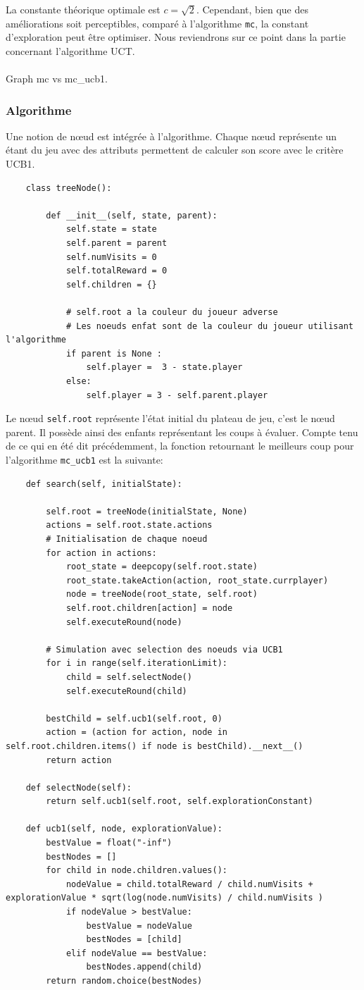 \documentclass[a4paper]{article}
\theoremstyle{definition}
\begin{document}
La constante théorique optimale est $c=\sqrt{2}$. Cependant, bien que des améliorations soit perceptibles, comparé à l'algorithme \texttt{mc}, la constant d'exploration peut être optimiser. Nous reviendrons sur ce point dans la partie concernant l'algorithme UCT. \\ \\
 
Graph mc vs mc\_ucb1.

\subsubsection{Algorithme}

Une notion de nœud est intégrée à l'algorithme. Chaque nœud représente un étant du jeu avec des attributs permettent de calculer son score avec le critère UCB1.
\newpage
\begin{lstlisting}
	class treeNode():
	
		def __init__(self, state, parent):
			self.state = state
			self.parent = parent
			self.numVisits = 0
			self.totalReward = 0
			self.children = {}
			
			# self.root a la couleur du joueur adverse 
			# Les noeuds enfat sont de la couleur du joueur utilisant l'algorithme
			if parent is None : 
				self.player =  3 - state.player
			else:
				self.player = 3 - self.parent.player
\end{lstlisting}

Le nœud \texttt{self.root} représente l'état initial du plateau de jeu, c'est le nœud parent. Il possède ainsi des enfants représentant les coups à évaluer. Compte tenu de ce qui en été dit précédemment, la fonction retournant le meilleurs coup pour l'algorithme \texttt{mc\_ucb1} est la suivante:

\begin{lstlisting}
	def search(self, initialState):
	
		self.root = treeNode(initialState, None)
		actions = self.root.state.actions
		# Initialisation de chaque noeud
		for action in actions:
			root_state = deepcopy(self.root.state)
			root_state.takeAction(action, root_state.currplayer)
			node = treeNode(root_state, self.root)
			self.root.children[action] = node
			self.executeRound(node)
		
		# Simulation avec selection des noeuds via UCB1
		for i in range(self.iterationLimit):
			child = self.selectNode()
			self.executeRound(child)
		
		bestChild = self.ucb1(self.root, 0)
		action = (action for action, node in self.root.children.items() if node is bestChild).__next__()
		return action
	
	def selectNode(self):
		return self.ucb1(self.root, self.explorationConstant)
		
	def ucb1(self, node, explorationValue):
		bestValue = float("-inf")
		bestNodes = []
		for child in node.children.values():
			nodeValue = child.totalReward / child.numVisits + explorationValue * sqrt(log(node.numVisits) / child.numVisits )
			if nodeValue > bestValue:
				bestValue = nodeValue
				bestNodes = [child]
			elif nodeValue == bestValue:
				bestNodes.append(child)
		return random.choice(bestNodes)
\end{lstlisting}
\end{document}
